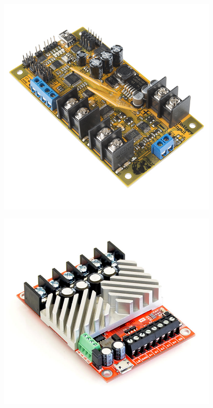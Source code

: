 \begin{figure}
    \centering
    \begin{minipage}{.5\textwidth}
        \centering
        \includegraphics[width=\linewidth]{figures/trex.jpg}
        \label{fig:test1}
    \end{minipage}%
    \begin{minipage}{.5\textwidth}
        \centering
        \includegraphics[width=\linewidth]{figures/roboclaw.jpg}
        \label{fig:test1}
    \end{minipage}
\end{figure}



